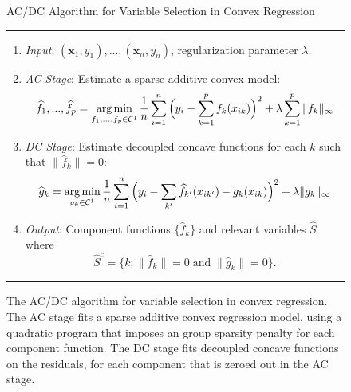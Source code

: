 \begin{figure}[t]
{\sc AC/DC Algorithm for Variable Selection in Convex Regression\hfill}
\vskip5pt
\begin{center}
\hrule
\vskip7pt
\normalsize
\begin{enumerate}
\item[] \textit{Input}:  $(\mathbf{x}_1, y_1), ..., (\mathbf{x}_n, y_n)$, regularization parameter $\lambda$.
\vskip5pt
\item[] \textit{AC Stage}:  Estimate a sparse additive convex model:
\begin{equation}
\label{eqn:scam2}
\widehat{f}_1, ..., \widehat{f}_p = \mathop{\text{\rm arg\,min}}_{f_1,...,f_p \in \mathcal{C}^1} 
   \frac{1}{n} \sum_{i=1}^n \Big(y_i - \sum_{k=1}^p f_k(x_{ik}) \Big)^2 
       + \lambda \sum_{k=1}^p \| f_k \|_\infty
\end{equation}
\vskip5pt
\item[] \textit{DC Stage}:  Estimate decoupled concave functions
 for each $k$ such that $\| \hat{f}_k \| = 0$:
\begin{equation}
\label{eqn:dc2}
\widehat{g}_k = \mathop{\text{\rm arg\,min}}_{g_k \in \mathcal{C}^1} 
   \frac{1}{n} \sum_{i=1}^n \Big( y_i - \sum_{k'} \widehat{f}_{k'}(x_{ik'}) 
    - g_k(x_{ik})\Big)^2 
      + \lambda \| g_k \|_\infty
\end{equation}
\item[] \textit{Output}: Component functions $\{\hat f_k\}$ and 
relevant variables $\hat S$ where
\begin{equation}
\hat S^c = \bigl\{k : \| \hat{f}_k \| =
0 \; \mathrm{and}\; \|\hat{g}_k \|=0\bigr\}.
\end{equation}
\end{enumerate}
\vskip3pt
\hrule
\end{center}
\vskip0pt
\caption{The AC/DC algorithm for variable selection in convex
  regression.  The AC stage fits a sparse additive convex regression
  model, using a quadratic program that imposes an group sparsity
  penalty for each component function.  The DC stage fits
  decoupled concave functions on the residuals, for each 
  component that is zeroed out in the AC stage.}
\label{fig:backfitting:algo}
\end{figure}


 
